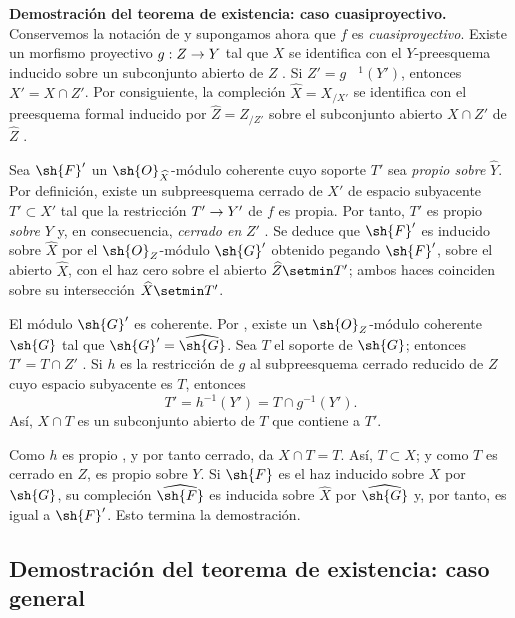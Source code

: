 \documentclass[oneside]{amsart}
\makeatletter
\newcommand{\ega@arrow}[2]{\mathchoice{#1}{#2}{#2}{#2}}
\renewcommand{\to}{\ega@arrow{\longrightarrow}{\rightarrow}}
\newcommand{\oldpage}[2][]{{\marginnote{\normalfont\textbf{#1}~|~#2}}\ignorespaces}
\let\EGAOriginalLabel\label
\renewcommand{\label}[1]{\phantomsection\EGAOriginalLabel{#1}}
\makeatother
\begin{document}
\begin{env}[5.2.6]
\label{III.5.2.6}
\textbf{Demostración del teorema de existencia: caso cuasiproyectivo.}
Conservemos la notación de  y supongamos ahora que $f$
es \emph{cuasiproyectivo}. Existe un morfismo proyectivo
$g:Z\to Y$ tal que $X$ se identifica con el $Y$-preesquema
inducido sobre un subconjunto abierto de $Z$ . Si
$Z'=g^{\phantom{-}1}(Y')$, entonces $X'=X\cap Z'$. Por consiguiente, la compleción
$\widehat{X}=X_{/X'}$ se identifica con el preesquema formal
inducido por $\widehat{Z}=Z_{/Z'}$ sobre el subconjunto abierto $X\cap Z'$ de
$\widehat{Z}$ .

Sea $\sh{F}'$ un $\sh{O}_{\widehat{X}}$-módulo coherente cuyo
soporte $T'$ sea \emph{propio sobre} $\widehat{Y}$. Por definición, existe
un subpreesquema cerrado de $X'$ de espacio subyacente
$T'\subset X'$ tal que la restricción $T'\to Y'$ de $f$ es
propia. Por tanto, $T'$ es propio \emph{sobre} $Y$ y, en consecuencia, \emph{cerrado en}
$Z'$ . Se deduce que $\sh{F}'$ es inducido
sobre $\widehat{X}$ por el $\sh{O}_Z$-módulo $\sh{G}'$
obtenido pegando $\sh{F}'$, sobre el abierto $\widehat{X}$, con el
haz cero sobre el abierto $\widehat Z\setmin T'$; ambos haces coinciden sobre
su intersección $\widehat X\setmin T'$.

El módulo $\sh{G}'$ es coherente. Por , existe un
$\sh{O}_Z$-módulo coherente $\sh{G}$ tal que
$\sh{G}'=\widehat{\sh{G}}$. Sea $T$ el soporte de $\sh{G}$;
entonces $T'=T\cap Z'$ . Si $h$ es la restricción
de $g$ al subpreesquema cerrado reducido de $Z$ cuyo espacio subyacente
es $T$, entonces
\[
  T'=h^{-1}(Y')=T\cap g^{-1}(Y').
\]
Así, $X\cap T$ es un subconjunto abierto de $T$ que contiene a $T'$.

\oldpage[III]{154}
Como $h$ es propio , y por tanto cerrado,
 da $X\cap T=T$. Así, $T\subset X$; y
como $T$ es cerrado en $Z$, es propio sobre $Y$. Si $\sh{F}$ es
el haz inducido sobre $X$ por $\sh{G}$, su compleción
$\widehat{\sh{F}}$ es inducida sobre $\widehat{X}$ por
$\widehat{\sh{G}}$  y, por tanto, es igual a
$\sh{F}'$. Esto termina la demostración.
\end{env}


\subsection{Demostración del teorema de existencia: caso general}
\label{subsection:III.5.3}
\end{document}
